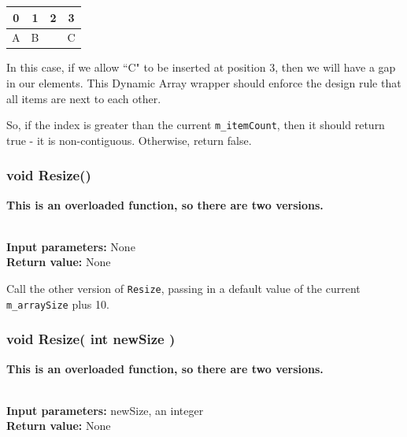 \documentclass[a4paper,12pt]{book}
\begin{document}
    \begin{center}
        \begin{tabular}{| c | c | c | c |}
            \hline
            0 & 1 & 2 & 3
            \\ \hline
            A & B & & C
            \\ \hline
        \end{tabular}
    \end{center}

    In this case, if we allow ``C" to be inserted at position 3, then
    we will have a gap in our elements. This Dynamic Array wrapper should
    enforce the design rule that all items are next to each other.

    So, if the index is greater than the current \texttt{m\_itemCount},
    then it should return true - it is non-contiguous. Otherwise,
    return false.

    
    \hrulefill
    \subsubsection*{void Resize()}

    \textbf{This is an overloaded function, so there are two versions.}

    \begin{framed} ~\\
        \textbf{Input parameters:} None \\
        \textbf{Return value:} None
    \end{framed}

    Call the other version of \texttt{Resize}, passing in a default
    value of the current \texttt{m\_arraySize} plus 10.


    
    
    \newpage
    \subsubsection*{void Resize( int newSize )}

    \textbf{This is an overloaded function, so there are two versions.}

    \begin{framed} ~\\
        \textbf{Input parameters:} newSize, an integer \\
        \textbf{Return value:} None
    \end{framed}
\end{document}
